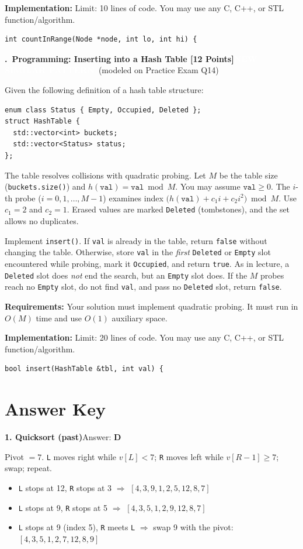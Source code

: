 \documentclass[11pt]{article}
\newcounter{qnum}
\newcommand{\tagnew}[1]{\colorbox{newc}{\textcolor{white}{\footnotesize\textbf{NEW -- SIMILAR PATTERN}}}\ {\footnotesize\textcolor{newc}{(modeled on #1)}}}
\newcommand{\question}[2]{\par\needspace{8\baselineskip}\medskip\stepcounter{qnum}%
  \noindent\textbf{\theqnum.\ #1}\hfill #2\par\nobreak\smallskip}
\newcommand{\answer}[2]{\par\medskip\noindent\textbf{#1}\quad Answer: \textbf{#2}\par\nobreak\smallskip}
\begin{document}
\smallskip\noindent\textbf{Implementation:} Limit: 10 lines of code. You may use any C, C++, or STL function/algorithm.
\begin{lstlisting}
int countInRange(Node *node, int lo, int hi) {
\end{lstlisting}

\question{Programming: Inserting into a Hash Table [12 Points]}{\tagnew{Practice Exam Q14}}
Given the following definition of a hash table structure:
\begin{lstlisting}
enum class Status { Empty, Occupied, Deleted };
struct HashTable {
  std::vector<int> buckets;
  std::vector<Status> status;
};
\end{lstlisting}
The table resolves collisions with quadratic probing. Let $M$ be the table size (\texttt{buckets.size()}) and
$h(\texttt{val}) = \texttt{val} \bmod M$. You may assume $\texttt{val} \ge 0$. The $i$-th probe ($i = 0, 1, \ldots, M-1$)
examines index $\big(h(\texttt{val}) + c_1 i + c_2 i^2\big) \bmod M$. Use $c_1 = 2$ and $c_2 = 1$.
Erased values are marked \texttt{Deleted} (tombstones), and the set allows no duplicates.

Implement \texttt{insert()}. If \texttt{val} is already in the table, return \texttt{false} without changing the table.
Otherwise, store \texttt{val} in the \emph{first} \texttt{Deleted} or \texttt{Empty} slot encountered while probing,
mark it \texttt{Occupied}, and return \texttt{true}. As in lecture, a \texttt{Deleted} slot does \emph{not} end the
search, but an \texttt{Empty} slot does. If the $M$ probes reach no \texttt{Empty} slot, do not find \texttt{val}, and
pass no \texttt{Deleted} slot, return \texttt{false}.

\smallskip\noindent\textbf{Requirements:} Your solution must implement quadratic probing. It must run in $O(M)$ time
and use $O(1)$ auxiliary space.

\smallskip\noindent\textbf{Implementation:} Limit: 20 lines of code. You may use any C, C++, or STL function/algorithm.
\begin{lstlisting}
bool insert(HashTable &tbl, int val) {
\end{lstlisting}

\newpage
\section*{Answer Key}

\answer{1. Quicksort (past)}{D}
Pivot $=7$. \texttt{L} moves right while $v[L] < 7$; \texttt{R} moves left while $v[R-1] \ge 7$; swap; repeat.
\begin{itemize}[nosep]
  \item \texttt{L} stops at 12, \texttt{R} stops at 3 $\Rightarrow$ $[4,3,9,1,2,5,12,8,7]$
  \item \texttt{L} stops at 9, \texttt{R} stops at 5 $\Rightarrow$ $[4,3,5,1,2,9,12,8,7]$
  \item \texttt{L} stops at 9 (index 5), \texttt{R} meets \texttt{L} $\Rightarrow$ swap 9 with the pivot: $[4,3,5,1,2,7,12,8,9]$
\end{itemize}
\end{document}
